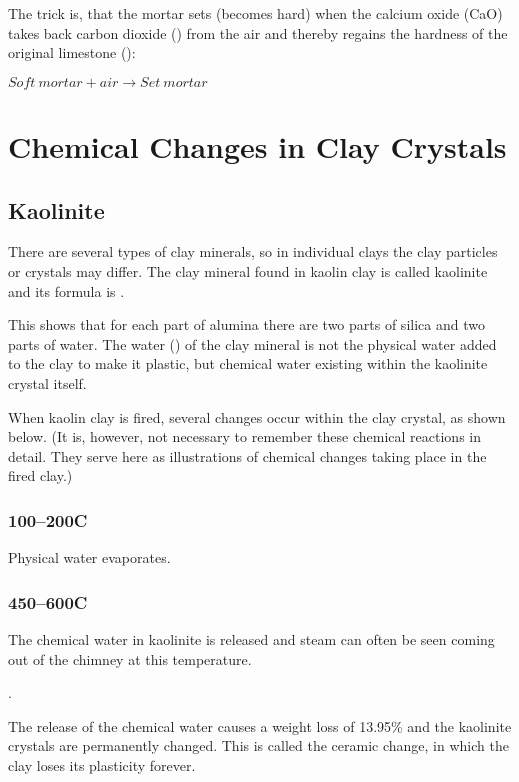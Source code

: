 The trick is, that the mortar sets (becomes hard) when the calcium oxide (CaO) 
takes back carbon dioxide () from the air and thereby regains the 
hardness of the original limestone ():


$Soft~mortar+air \rightarrow Set~mortar$
\section{Chemical Changes in Clay Crystals}
\subsection{Kaolinite}
There are several types of clay minerals, so in individual clays the clay 
particles or crystals may differ. The clay mineral found in kaolin clay is 
called kaolinite and its formula is .

This shows that for each part of alumina there are two parts of silica and two 
parts of water. The water () of the clay mineral is not the physical water 
added to the clay to make it plastic, but chemical water existing within the 
kaolinite crystal itself.

When kaolin clay is fired, several changes occur within the clay crystal, as 
shown below. (It is, however, not necessary to remember these chemical 
reactions in detail. They serve here as illustrations of chemical changes 
taking place in the fired clay.)
\subsubsection{100--200\degree C}
Physical water evaporates.
\subsubsection{450--600\degree C}
The chemical water in kaolinite is released and steam can often be seen coming 
out of the chimney at this temperature. 

. 

The release of the chemical water causes a weight loss of 13.95\% and the 
kaolinite crystals are permanently changed. This is called the ceramic change, 
in which the clay loses its plasticity forever.
